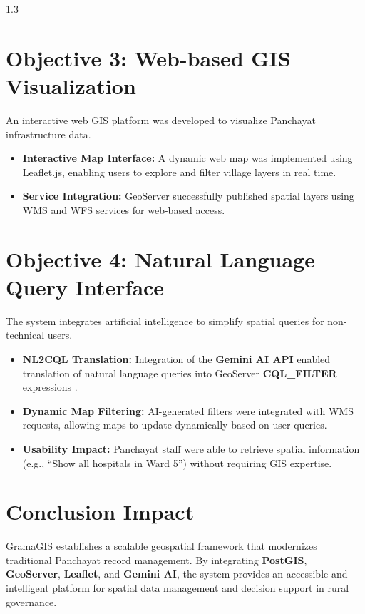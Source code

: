 \begin{spacing}{1.3}
\section{Objective 3: Web-based GIS Visualization}

An interactive web GIS platform was developed to visualize Panchayat infrastructure data.

\begin{itemize}
    \item \textbf{Interactive Map Interface:} A dynamic web map was implemented using Leaflet.js, enabling users to explore and filter village layers in real time.
    \item \textbf{Service Integration:} GeoServer successfully published spatial layers using WMS and WFS services for web-based access.
\end{itemize}

\section{Objective 4: Natural Language Query Interface}

The system integrates artificial intelligence to simplify spatial queries for non-technical users.

\begin{itemize}
    \item \textbf{NL2CQL Translation:} Integration of the \textbf{Gemini AI API} enabled translation of natural language queries into GeoServer \textbf{CQL\_FILTER} expressions \cite{liu2025nalspatial}.
    \item \textbf{Dynamic Map Filtering:} AI-generated filters were integrated with WMS requests, allowing maps to update dynamically based on user queries.
    \item \textbf{Usability Impact:} Panchayat staff were able to retrieve spatial information (e.g., “Show all hospitals in Ward 5”) without requiring GIS expertise.
\end{itemize}



\section{Conclusion Impact}

GramaGIS establishes a scalable geospatial framework that modernizes traditional Panchayat record management. By integrating \textbf{PostGIS}, \textbf{GeoServer}, \textbf{Leaflet}, and \textbf{Gemini AI}, the system provides an accessible and intelligent platform for spatial data management and decision support in rural governance.


\end{spacing}
